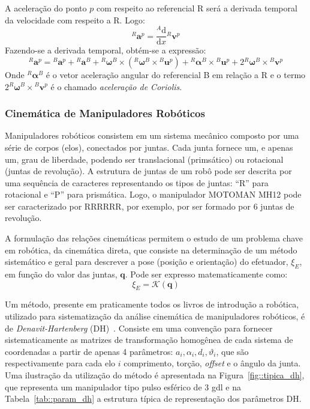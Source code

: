 A aceleração do ponto $p$ com respeito ao referencial R será a derivada temporal
da velocidade com respeito a R. Logo:
%
\begin{equation}
	^{R}\mathbf{a}^{p} = \frac{^{A}\mathrm{d} }{\mathrm{d} x} {^{R}\mathbf{v}^{p}}
\end{equation}
%
Fazendo-se a derivada temporal, obtém-se a expressão:
%
\begin{equation}
	^{R}\mathbf{a}^{p} = {}^{B}\mathbf{a}^{p} + {}^{R}\mathbf{a}^{B} +
	{}^{R}\boldsymbol{\omega}^{B} \times ({}^{R}\boldsymbol{\omega}^{B} \times
	{}^{B}\mathbf{u}^{p}) + {}^{R}\boldsymbol{\alpha}^{B} \times {}^{B}\mathbf{u}^{p}
	+ 2{}^{R}\boldsymbol{\omega}^{B} \times {}^{B}\mathbf{v}^{p}
\end{equation}
%
Onde ${}^{R}\boldsymbol{\alpha}^{B}$ é o vetor aceleração angular do referencial
B em relação a R e o termo $2{}^{R}\boldsymbol{\omega}^{B} \times
{}^{B}\mathbf{v}^{p}$ é o chamado \emph{aceleração de Coriolis}. 


\subsubsection{Cinemática de Manipuladores Robóticos}

Manipuladores robóticos consistem em um sistema mecânico composto por uma série
de corpos (elos), conectados por juntas. Cada junta fornece um, e apenas um,
grau de liberdade, podendo ser translacional (primsático) ou rotacional (juntas de
revolução). A estrutura de juntas de um robô pode ser descrita por uma sequência
de caracteres representando os tipos de juntas: ``R'' para rotacional e ``P''
para prismática. Logo, o manipulador MOTOMAN MH12 pode ser caracterizado por
RRRRRR, por exemplo, por ser formado por 6 juntas de revolução.

A formulação das relações cinemáticas permitem o estudo de um problema chave em
robótica, da cinemática direta, que consiste na determinação de um método
sistemático e geral para descrever a pose (posição e orientação) do
efetuador, $\xi_{E}$, em função do valor das juntas, $\mathbf{q}$. Pode ser
expresso matematicamente como:
%
\begin{equation}
	\xi_{E} = \mathcal{K}(\mathbf{q})
\end{equation}
%

Um método, presente em praticamente todos os livros de introdução a robótica,
utilizado para sistematização da análise cinemática de manipuladores robóticos,
é de \emph{Denavit-Hartenberg} (DH)~\cite{denavit1955}.
Consiste em uma convenção para fornecer sistematicamente as matrizes de
transformação homogênea de cada sistema de coordenadas a partir de apenas 4
parâmetros:
$a_i, \alpha_i, d_i, \vartheta_i$, que são respectivamente para cada elo $i$
comprimento, torção, \textit{offset} e o ângulo da junta.
Uma ilustração da utilização do método é apresentada na
Figura~\ref{fig::tipica_dh}, que representa um manipulador tipo pulso esférico
de 3 gdl e na Tabela~\ref{tab::param_dh} a estrutura típica de representação dos
parâmetros DH.

